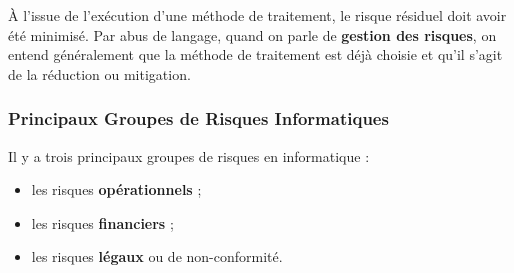 À l'issue de l'exécution d'une méthode de traitement, le risque résiduel doit avoir
été minimisé. Par abus de langage, quand on parle de \textbf{gestion des risques},
on entend généralement que la méthode de traitement est déjà choisie et qu'il s'agit
de la réduction ou mitigation.

\subsubsection{Principaux Groupes de Risques Informatiques}

Il y a trois principaux groupes de risques en informatique :
\begin{itemize}
  \item les risques \textbf{opérationnels} ;
  \item les risques \textbf{financiers} ;
  \item les risques \textbf{légaux} ou de non-conformité.
\end{itemize}

